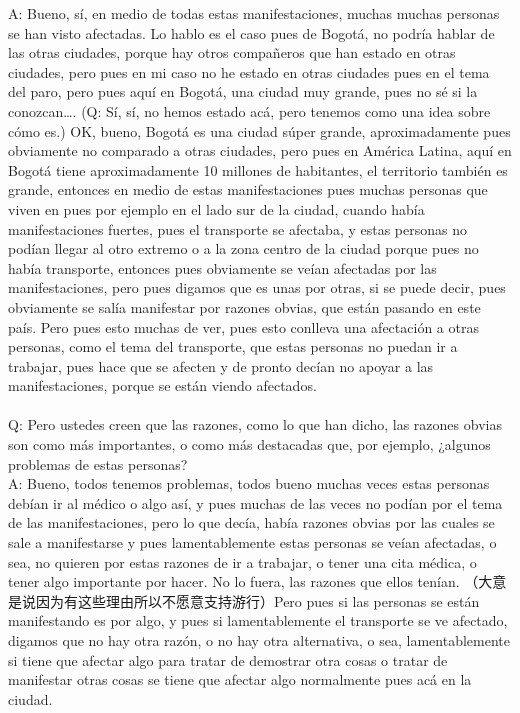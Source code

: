 \documentclass{phyasgn}\usepackage{nag}
\begin{document}
A: Bueno, sí, en medio de todas estas manifestaciones, muchas muchas personas se han visto afectadas. Lo hablo es el caso pues de Bogotá, no podría hablar de las otras ciudades, porque hay otros compañeros que han estado en otras ciudades, pero pues en mi caso no he estado en otras ciudades pues en el tema del paro, pero pues aquí en Bogotá, una ciudad muy grande, pues no sé si la conozcan…. (Q: Sí, sí, no hemos estado acá, pero tenemos como una idea sobre cómo es.) OK, bueno, Bogotá es una ciudad súper grande, aproximadamente pues obviamente no comparado a otras ciudades, pero pues en América Latina, aquí en Bogotá tiene aproximadamente 10 millones de habitantes, el territorio también es grande, entonces en medio de estas manifestaciones pues muchas personas que viven en pues por ejemplo en el lado sur de la ciudad, cuando había manifestaciones fuertes, pues el transporte se afectaba, y estas personas no podían llegar al otro extremo o a la zona centro de la ciudad porque pues no había transporte, entonces pues obviamente se veían afectadas por las manifestaciones, pero pues digamos que es unas por otras, si se puede decir, pues obviamente se salía manifestar por razones obvias, que están pasando en este país. Pero pues esto muchas de ver, pues esto conlleva una afectación a otras personas, como el tema del transporte, que estas personas no puedan ir a trabajar, pues hace que se afecten y de pronto decían no apoyar a las manifestaciones, porque se están viendo afectados. \\
\\
Q: Pero ustedes creen que las razones, como lo que han dicho, las razones obvias son como más importantes, o como más destacadas que, por ejemplo, ¿algunos problemas de estas personas?\\
A: Bueno, todos tenemos problemas, todos bueno muchas veces estas personas debían ir al médico o algo así, y pues muchas de las veces no podían por el tema de las manifestaciones, pero lo que decía, había razones obvias por las cuales se sale a manifestarse y pues lamentablemente estas personas se veían afectadas, o sea, no quieren por estas razones de ir a trabajar, o tener una cita médica, o tener algo importante por hacer. No lo fuera, las razones que ellos tenían. （大意是说因为有这些理由所以不愿意支持游行）Pero pues si las personas se están manifestando es por algo, y pues si lamentablemente el transporte se ve afectado, digamos que no hay otra razón, o no hay otra alternativa, o sea, lamentablemente si tiene que afectar algo para tratar de demostrar otra cosas o tratar de manifestar otras cosas se tiene que afectar algo normalmente pues acá en la ciudad.\\
\end{document}
